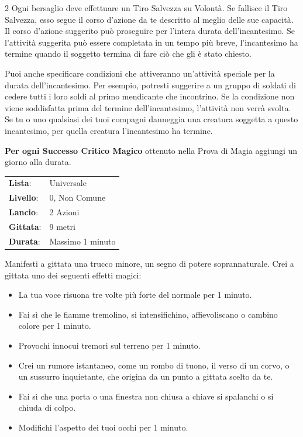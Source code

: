 \begin{multicols}{2}
Ogni bersaglio deve effettuare un Tiro Salvezza su Volontà. Se fallisce il Tiro Salvezza, esso segue il corso d'azione da te descritto al meglio delle sue capacità. Il corso d'azione suggerito può proseguire per l'intera durata dell'incantesimo. Se l'attività suggerita può essere completata in un tempo più breve, l'incantesimo ha termine quando il soggetto termina di fare ciò che gli è stato chiesto.

Puoi anche specificare condizioni che attiveranno un'attività speciale per la durata dell'incantesimo. Per esempio, potresti suggerire a un gruppo di soldati di cedere tutti i loro soldi al primo mendicante che incontrino. Se la condizione non viene soddisfatta prima del termine dell'incantesimo, l'attività non verrà svolta. Se tu o uno qualsiasi dei tuoi compagni danneggia una creatura soggetta a questo incantesimo, per quella creatura l'incantesimo ha termine.

\textbf{Per ogni Successo Critico Magico} ottenuto nella Prova di Magia aggiungi un giorno alla durata.

\noindent\begin{tabularx}{\linewidth}{p{1.9cm}X}
	\rowcolor{gray!20}\textbf{Lista}: & Universale \\
	\textbf{Livello}: & 0, Non Comune \\
	\rowcolor{gray!20}\textbf{Lancio}: & 2 Azioni \\
	\textbf{Gittata}: & 9 metri \\
	\rowcolor{gray!20}\textbf{Durata}: & Massimo 1 minuto \\
\end{tabularx}\smallskip

Manifesti a gittata una trucco minore, un segno di potere soprannaturale. Crei a gittata uno dei seguenti effetti magici:

\begin{itemize}[leftmargin=*] \setlength{\itemsep}{0pt}
	\item La tua voce risuona tre volte più forte del normale per 1 minuto.
	\item Fai sì che le fiamme tremolino, si intensifichino, affievoliscano o cambino colore per 1 minuto.
	\item Provochi innocui tremori sul terreno per 1 minuto.
	\item Crei un rumore istantaneo, come un rombo di tuono, il verso di un corvo, o un sussurro inquietante, che origina da un punto a gittata scelto da te.
	\item Fai sì che una porta o una finestra non chiusa a chiave si spalanchi o si chiuda di colpo.
	\item Modifichi l'aspetto dei tuoi occhi per 1 minuto.
\end{itemize}


\end{multicols}
